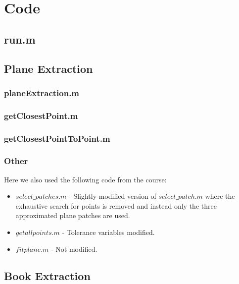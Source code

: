 \section{Code}
\subsection{run.m}




\subsection{Plane Extraction}

\subsubsection{planeExtraction.m}


\subsubsection{getClosestPoint.m}


\subsubsection{getClosestPointToPoint.m}


\subsubsection{Other}
Here we also used the following code from the course:
\begin{itemize}
	\item $select\_patches.m$ - Slightly modified version of $select\_patch.m$ where the exhaustive search for points is removed and instead only the three approximated plane patches are used.
	\item $getallpoints.m$ - Tolerance variables modified.
	\item $fitplane.m$ - Not modified.
\end{itemize}



\subsection{Book Extraction}

